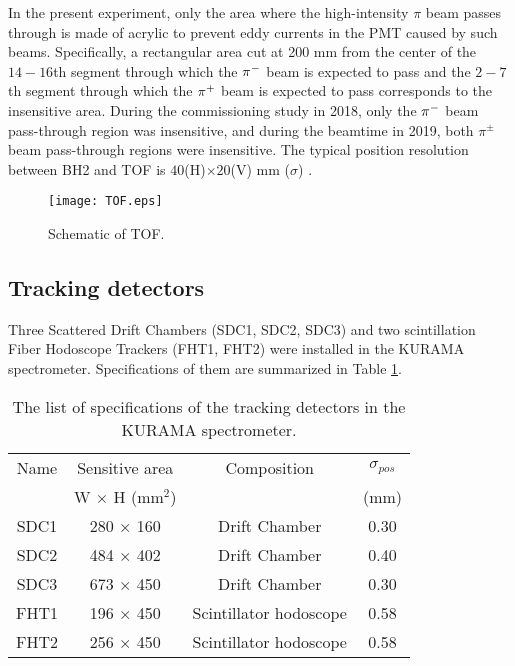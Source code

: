 In the present experiment, only the area where the high-intensity $\pi$ beam passes through is made of acrylic to prevent eddy currents in the PMT caused by such beams. 
Specifically, a rectangular area cut at 200 mm from the center of the $14-16$th segment through which the $\pi^{-}$ beam is expected to pass and the $2-7$th segment through which the $\pi^{+}$ beam is expected to pass corresponds to the insensitive area. During the commissioning study in 2018, only the $\pi^{-}$ beam pass-through region was insensitive, and during the beamtime in 2019, both $\pi^{\pm}$ beam pass-through regions were insensitive. The typical position resolution between BH2 and TOF is $40$(H)$\times20$(V) mm ($\sigma$) \cite{Nana-D}. 

\begin{figure}[!h]
 \begin{center}
   \texttt{[image: TOF.eps]}
   \caption{Schematic of TOF.}
   \label{fig-TOF}
 \end{center}
\end{figure}

\subsection{Tracking detectors}
Three Scattered Drift Chambers (SDC1, SDC2, SDC3) and two scintillation Fiber Hodoscope Trackers (FHT1, FHT2) were installed in the KURAMA spectrometer. Specifications of them are summarized in Table \ref{tab-KURAMAspec-track}.

\begin{table}[h]
  \begin{center}
    \caption{The list of specifications of the tracking detectors in the KURAMA spectrometer.}
    \begin{tabular}{cccc} \hline \hline
      Name & Sensitive area & Composition & $\sigma_{pos}$ \\
       & W $\times$ H (mm$^2$) & & (mm) \\ \hline
      SDC1& 280 $\times$ 160 & Drift Chamber & 0.30 \\
      SDC2& 484 $\times$ 402 & Drift Chamber & 0.40 \\
      SDC3 & 673 $\times$ 450 & Drift Chamber & 0.30 \\ 
      FHT1 & 196 $\times$ 450 & Scintillator hodoscope & 0.58 \\
      FHT2 & 256 $\times$ 450 & Scintillator hodoscope & 0.58 \\ 
\hline\hline
   \end{tabular}
   \label{tab-KURAMAspec-track}
   \end{center}
\end{table}

